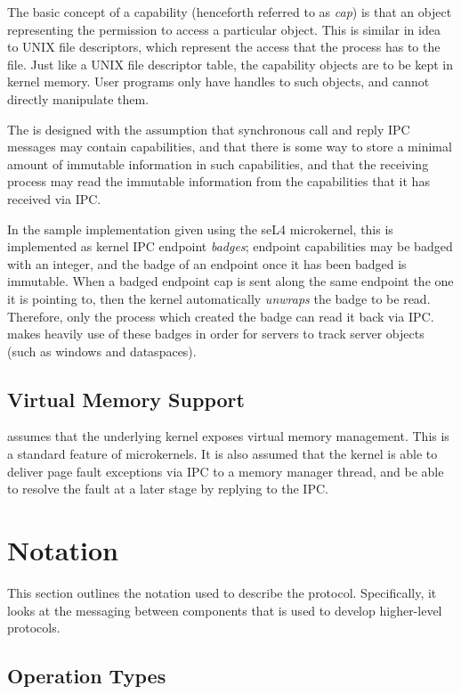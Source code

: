 The basic concept of a capability (henceforth referred to as \emph{cap}) is that
an object representing the permission to access a particular object. This is
similar in idea to UNIX file descriptors, which represent the access that the
process has to the file. Just like a UNIX file descriptor table, the capability
objects are to be kept in kernel memory. User programs only have handles to
such objects, and cannot directly manipulate them.

The  is designed with the assumption that synchronous call and reply IPC
messages may contain capabilities, and that there is some way to store a
minimal amount of immutable information in such capabilities, and that the
receiving process may read the immutable information from the capabilities that
it has received via IPC. 

In the sample implementation given using the seL4 microkernel, this is
implemented as kernel IPC endpoint \emph{badges}; endpoint capabilities may be
badged with an integer, and the badge of an endpoint once it has been badged is
immutable. When a badged endpoint cap is sent along the same endpoint the one
it is pointing to, then the kernel automatically \emph{unwraps} the badge to be
read. Therefore, only the process which created the badge can read it back via
IPC.  makes heavily use of these badges in order for servers to track
server objects (such as windows and dataspaces).

\subsection{Virtual Memory Support}

 assumes that the underlying kernel exposes virtual memory management.
This is a standard feature of microkernels. It is also assumed that the kernel
is able to deliver page fault exceptions via IPC to a memory manager thread,
and be able to resolve the fault at a later stage by replying to the IPC.

\section{Notation}

This section outlines the notation used to describe the  protocol.
Specifically, it looks at the messaging between components that is used to
develop higher-level protocols. 

\subsection{Operation Types} 

